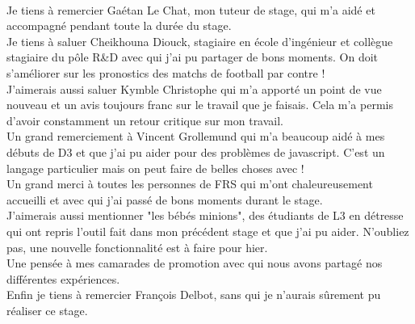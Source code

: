 \\
Je tiens à remercier Gaétan Le Chat, mon tuteur de stage, qui m'a aidé et accompagné pendant toute la durée du stage.\\

Je tiens à saluer Cheikhouna Diouck, stagiaire en école d'ingénieur et collègue stagiaire du pôle R\&D avec qui j'ai pu partager de bons moments. On doit s'améliorer sur les pronostics des matchs de football par contre !\\

J'aimerais aussi saluer Kymble Christophe qui m'a apporté un point de vue nouveau et un avis toujours franc sur le travail que je faisais. Cela m'a permis d'avoir constamment un retour critique sur mon travail.\\

Un grand remerciement à Vincent Grollemund qui m'a beaucoup aidé à mes débuts de D3 et que j'ai pu aider pour des problèmes de javascript. C'est un langage particulier mais on peut faire de belles choses avec !\\

Un grand merci à toutes les personnes de FRS qui m'ont chaleureusement accueilli et avec qui j'ai passé de bons moments durant le stage.\\

J'aimerais aussi mentionner "les bébés minions", des étudiants de L3 en détresse qui ont repris l'outil fait dans mon précédent stage et que j'ai pu aider. N'oubliez pas, une nouvelle fonctionnalité est à faire pour hier.\\

Une pensée à mes camarades de promotion avec qui nous avons partagé nos différentes expériences.\\

Enfin je tiens à remercier François Delbot, sans qui je n'aurais sûrement pu réaliser ce stage.\\